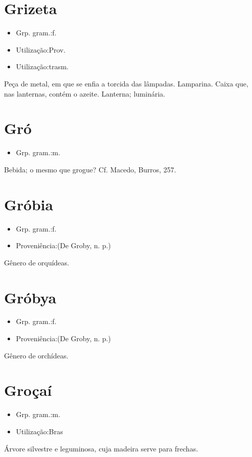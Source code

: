 \section{Grizeta}
\begin{itemize}
\item {Grp. gram.:f.}
\end{itemize}
\begin{itemize}
\item {Utilização:Prov.}
\end{itemize}
\begin{itemize}
\item {Utilização:trasm.}
\end{itemize}
Peça de metal, em que se enfia a torcida das lâmpadas.
Lamparina.
Caixa que, nas lanternas, contém o azeite.
Lanterna; luminária.
\section{Gró}
\begin{itemize}
\item {Grp. gram.:m.}
\end{itemize}
Bebida; o mesmo que \textunderscore grogue\textunderscore ? Cf. Macedo, \textunderscore Burros\textunderscore , 257.
\section{Gróbia}
\begin{itemize}
\item {Grp. gram.:f.}
\end{itemize}
\begin{itemize}
\item {Proveniência:(De \textunderscore Groby\textunderscore , n. p.)}
\end{itemize}
Gênero de orquídeas.
\section{Gróbya}
\begin{itemize}
\item {Grp. gram.:f.}
\end{itemize}
\begin{itemize}
\item {Proveniência:(De \textunderscore Groby\textunderscore , n. p.)}
\end{itemize}
Gênero de orchídeas.
\section{Groçaí}
\begin{itemize}
\item {Grp. gram.:m.}
\end{itemize}
\begin{itemize}
\item {Utilização:Bras}
\end{itemize}
Árvore silvestre e leguminosa, cuja madeira serve para frechas.
